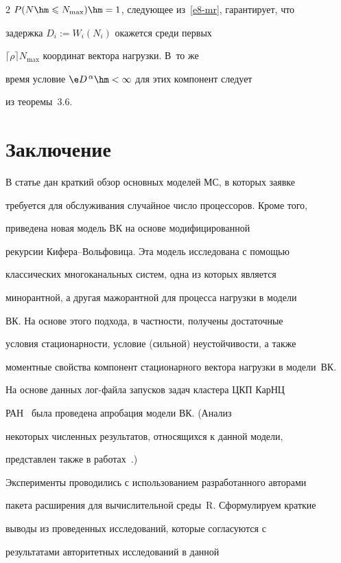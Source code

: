 \begin{multicols}{2}
$P(N\hm\leqslant N_{\max})\hm=1$, следующее из~\eqref{e8-mr}, гарантирует, что

задержка $D_{i}:=W_{i}(N_{i})$ окажется среди первых

$\lceil\rho\rceil N_{\max}$ координат вектора нагрузки. В~то же

время условие $\e D^{\,\alpha}\hm<\infty$  для этих компонент  следует

из теоремы~3.6.





\section{Заключение}\label{sec4}



В  статье  дан краткий обзор основных  моделей МС, в которых  заявке

требуется  для обслуживания случайное число процессоров.   Кроме того,

 приведена новая модель ВК на основе модифицированной

рекурсии Ки\-фе\-ра--Воль\-фо\-ви\-ца. Эта модель исследована  с по\-мощью

классических многоканальных систем, одна из которых является

минорантной, а другая   мажорантной для процесса нагрузки в  модели

ВК. На основе этого подхода, в частности, получены   достаточные

условия стационарности, условие (сильной) неустойчивости, а также

моментные свойства компонент стационарного вектора нагрузки в модели~ВК.



На основе данных лог-фай\-ла запусков задач кластера ЦКП КарНЦ

РАН~\cite{cluster} была проведена апробация модели ВК. (Анализ

некоторых численных результатов, относящихся к данной модели,

представлен также в работах~\cite{krc11, aptpms11, hpc11}.)

Эксперименты проводились с использованием разработанного авторами

пакета расширения для вычислительной среды~R. Сформулируем  краткие

выводы из проведенных    исследований, которые   согласуются с

результатами авторитетных исследований в данной


\end{multicols}
